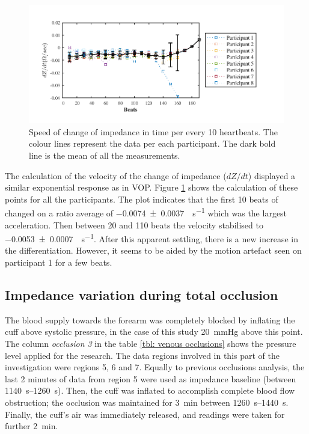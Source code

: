 \begin{figure}[!t]
	\centering
	\includegraphics[width=15cm,keepaspectratio]{figure_vop_6}    
	\caption[Rate of change of impedance per 10 heartbeats during partial arterial occlusion]{Speed of change of impedance in time per every 10 heartbeats. The colour lines represent the data per each participant. The dark bold line is the mean of all the measurements.}
	\label{fig:arterial occlusion change}
\end{figure}  

The calculation of the velocity of the change of impedance  ($dZ/dt$) displayed a similar exponential response as in VOP. Figure \ref{fig:arterial occlusion change} shows the calculation of these points for all the participants. The plot indicates that the first 10 beats of changed on a ratio average of \SI{-0.0074(00037)}{\Omega\per\second} which was the largest acceleration. Then between 20 and 110 beats the velocity stabilised to \SI{-0.0053(00007)}{\Omega\per\second}. After this apparent settling, there is a new increase in the differentiation. However, it seems to be aided by the motion artefact seen on participant 1 for a few beats.

\subsection{Impedance variation during total occlusion}
\label{section occlusion 1.3}
The blood supply towards the forearm was completely blocked by inflating the cuff above systolic pressure, in the case of this study \SI{20}{\mmHg} above this point. The column \textit{occlusion 3} in the table \ref{tbl: venous occlusions} shows the pressure level applied for the research. The data regions involved in this part of the investigation were regions 5, 6 and 7. Equally to previous occlusions analysis, the last 2 minutes of data from region 5 were used as impedance baseline (between \SIrange{1140}{1260}{\second}). Then, the cuff was inflated to accomplish complete blood flow obstruction; the occlusion was maintained for \SI{3}{\minute} between \SIrange{1260}{1440}{\second}. Finally, the cuff's air was immediately released, and readings were taken for further \SI{2}{\minute}.

